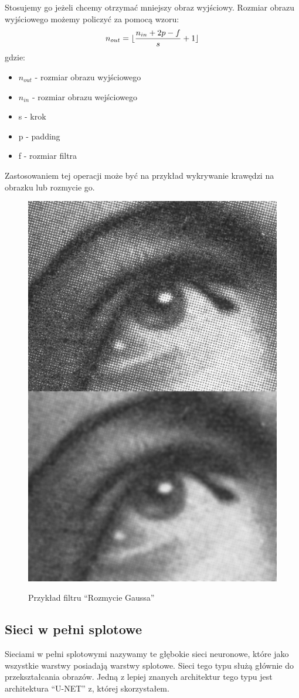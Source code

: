 \documentclass{article}
\DeclarePairedDelimiter\floor{\lfloor}{\rfloor}
\begin{document}
Stosujemy go jeżeli chcemy otrzymać mniejszy obraz wyjściowy.
Rozmiar obrazu wyjściowego możemy policzyć za pomocą wzoru:
\begin{align*}
    n_{out} = \floor{\frac{n_{in}+2p-f}{s}+1}
\end{align*}
gdzie:
\begin{itemize}
    \item $n_{out}$ - rozmiar obrazu wyjściowego
    \item $n_{in}$ - rozmiar obrazu wejściowego
    \item s - krok
    \item p - padding
    \item f - rozmiar filtra
\end{itemize}

Zastosowaniem tej operacji może być na przykład wykrywanie krawędzi na obrazku lub rozmycie go.

\begin{figure}[H]
    \centering
    \includegraphics[width=\linewidth,height=\linewidth]{images/cnn_blur.jpg}
    \caption{Przykład filtru ``Rozmycie Gaussa''}
    \cite{cnn_blur}
\end{figure}

\subsection{Sieci w pełni splotowe}
Sieciami w pełni splotowymi nazywamy te głębokie sieci neuronowe, które jako wszystkie warstwy posiadają warstwy splotowe.
Sieci tego typu służą głównie do przekształcania obrazów.
Jedną z lepiej znanych architektur tego typu jest architektura ``U-NET'' z, której skorzystałem.
\newpage
\end{document}
